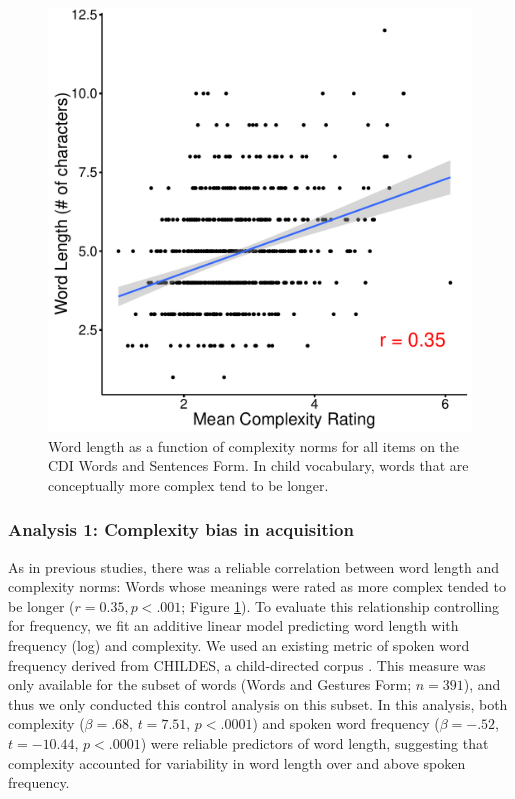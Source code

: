 \begin{figure}[t!]
\begin{center}
\includegraphics[scale = .5]{figs/chap4_3.pdf}
\end{center}
\caption{Word length as a function of complexity norms for all items on the CDI Words and Sentences Form. In child vocabulary, words that are conceptually more complex tend to be longer.}
\label{fig:study3}
\end{figure}


\subsubsection{Analysis 1: Complexity bias in acquisition}
As in previous studies, there was a reliable correlation between word length and complexity norms: Words whose meanings were rated as more complex tended to be longer ($r=0.35, p<.001$; Figure \ref{fig:study3}). To evaluate this relationship controlling for frequency, we fit an additive linear model predicting word length with frequency (log) and complexity. We used an existing metric of spoken word frequency derived from CHILDES, a child-directed corpus \cite{braginsky2016from}. This measure was only available for the subset of words (Words and Gestures Form; $n = 391$), and thus we only conducted this control analysis on this subset. In this analysis, both complexity ($\beta=.68$, $t=7.51$, $p <.0001$) and spoken word frequency ($\beta=-.52$, $t=-10.44$, $p <.0001$) were reliable predictors of word length, suggesting that complexity accounted for variability in word length over and above spoken frequency.

